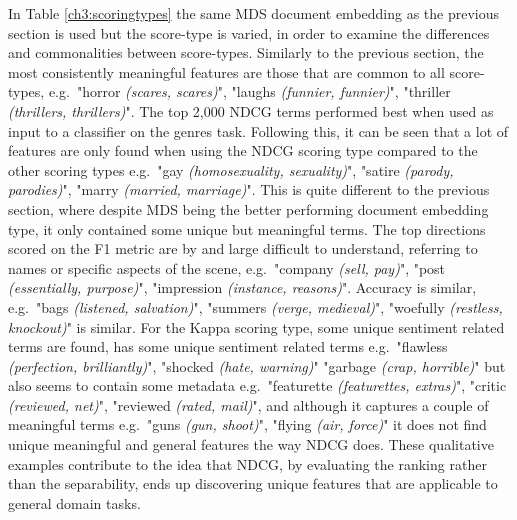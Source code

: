
In Table \ref{ch3:scoringtypes} the same MDS document embedding as the previous section is used but the score-type is varied, in order to examine the differences and commonalities between score-types.  Similarly to the previous section,   the most consistently meaningful features are those that are common to all score-types, e.g.\ "horror \textit{(scares, scares)}", "laughs \textit{(funnier, funnier)}", "thriller \textit{(thrillers, thrillers)}". The top 2,000 NDCG terms performed best when used as input to a classifier on the genres task. Following this, it can be seen that a lot of features are only found when using the NDCG scoring type compared to the other scoring types e.g.\ "gay \textit{(homosexuality, sexuality)}", "satire \textit{(parody, parodies)}",  "marry \textit{(married, marriage)}". This is quite different to the previous section, where despite MDS being the better performing document embedding type, it only contained some unique but meaningful terms. The top directions scored on  the F1 metric  are by and large  difficult to understand, referring to names or specific aspects of the scene, e.g.\ "company \textit{(sell, pay)}", "post \textit{(essentially, purpose)}", "impression \textit{(instance, reasons)}". Accuracy is similar, e.g.\ "bags \textit{(listened, salvation)}",  "summers \textit{(verge, medieval)}", "woefully \textit{(restless, knockout)}" is similar. For the Kappa scoring type, some unique  sentiment  related terms are found, has some unique sentiment related terms e.g.\ "flawless \textit{(perfection, brilliantly)}", "shocked \textit{(hate, warning)}" "garbage \textit{(crap, horrible)}" but also seems to contain some metadata e.g.\ "featurette \textit{(featurettes, extras)}", "critic \textit{(reviewed, net)}", "reviewed \textit{(rated, mail)}", and although it captures  a couple of meaningful terms e.g.\ "guns \textit{(gun, shoot)}", "flying \textit{(air, force)}" it does not find unique meaningful and general features the way NDCG does. These qualitative examples contribute to the idea that NDCG, by evaluating the ranking rather than the separability, ends up discovering unique features that are applicable to general domain tasks.
